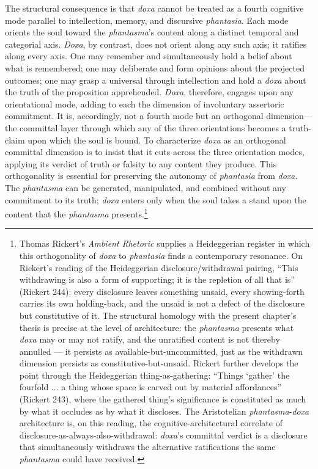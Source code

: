 \documentclass{article}
\begin{document}
The structural consequence is that \textit{doxa} cannot be treated as a fourth cognitive mode parallel to intellection, memory, and discursive \textit{phantasia}. Each mode orients the soul toward the \textit{phantasma}'s content along a distinct temporal and categorial axis. \textit{Doxa}, by contrast, does not orient along any such axis; it ratifies along every axis. One may remember and simultaneously hold a belief about what is remembered; one may deliberate and form opinions about the projected outcomes; one may grasp a universal through intellection and hold a \textit{doxa} about the truth of the proposition apprehended. \textit{Doxa}, therefore, engages upon any orientational mode, adding to each the dimension of involuntary assertoric commitment. It is, accordingly, not a fourth mode but an orthogonal dimension---the committal layer through which any of the three orientations becomes a truth-claim upon which the soul is bound. To characterize \textit{doxa} as an orthogonal committal dimension is to insist that it cuts across the three orientation modes, applying its verdict of truth or falsity to any content they produce. This orthogonality is essential for preserving the autonomy of \textit{phantasia} from \textit{doxa}. The \textit{phantasma} can be generated, manipulated, and combined without any commitment to its truth; \textit{doxa} enters only when the soul takes a stand upon the content that the \textit{phantasma} presents.\footnote{Thomas Rickert's \textit{Ambient Rhetoric} supplies a Heideggerian register in which this orthogonality of \textit{doxa} to \textit{phantasia} finds a contemporary resonance. On Rickert's reading of the Heideggerian disclosure/withdrawal pairing, ``This withdrawing is also a form of supporting; it is the repletion of all that is'' (Rickert 244): every disclosure leaves something unsaid, every showing-forth carries its own holding-back, and the unsaid is not a defect of the disclosure but constitutive of it. The structural homology with the present chapter's thesis is precise at the level of architecture: the \textit{phantasma} presents what \textit{doxa} may or may not ratify, and the unratified content is not thereby annulled --- it persists as available-but-uncommitted, just as the withdrawn dimension persists as constitutive-but-unsaid. Rickert further develops the point through the Heideggerian thing-as-gathering: ``Things `gather' the fourfold ... a thing whose space is carved out by material affordances'' (Rickert 243), where the gathered thing's significance is constituted as much by what it occludes as by what it discloses. The Aristotelian \textit{phantasma}-\textit{doxa} architecture is, on this reading, the cognitive-architectural correlate of disclosure-as-always-also-withdrawal: \textit{doxa}'s committal verdict is a disclosure that simultaneously withdraws the alternative ratifications the same \textit{phantasma} could have received.}
\end{document}
